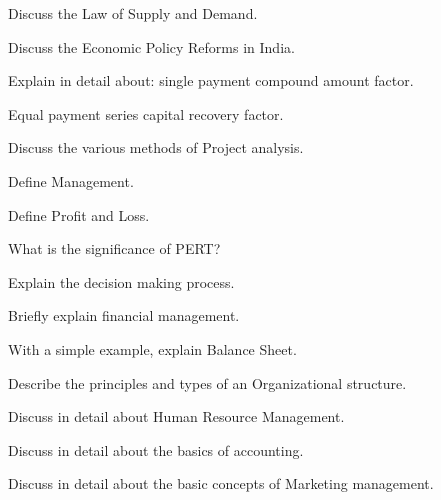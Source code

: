 \partCo

\item Discuss the Law of Supply and Demand. 
\Or
\item Discuss the Economic Policy Reforms in India. 

\item Explain in detail about:
\iitem single payment compound amount factor.
\item Equal payment series capital recovery factor. 
\ene
\Or
\item Discuss the various methods of Project analysis. 

\ene

\newpage \again

\sectionPM

\partA

\iitem Define Management. 
\item Define Profit and Loss.  
\item What is the significance of PERT?  \marka

\partBt

\item Explain the decision making process.  
\item Briefly explain financial management.  
\item With a simple example, explain Balance Sheet.  

\partCo

\item Describe the principles and types of an Organizational structure.  
\Or
\item Discuss in detail about Human Resource Management.  

\item Discuss in detail about the basics of accounting. 
\Or
\item Discuss in detail about the basic concepts of Marketing management.  

\ene
